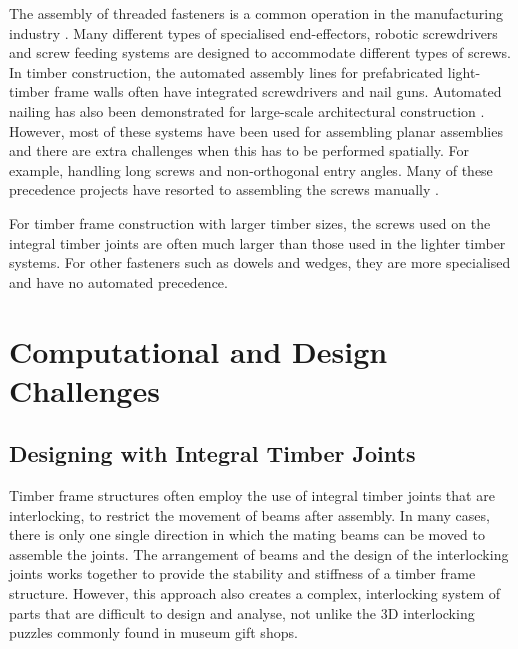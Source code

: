 The assembly of threaded fasteners is a common operation in the manufacturing industry \parencite{jiaSurveyAutomatedThreaded2019}. Many different types of specialised end-effectors, robotic screwdrivers and screw feeding systems are designed to accommodate different types of screws. In timber construction, the automated assembly lines for prefabricated light-timber frame walls often have integrated screwdrivers and nail guns. Automated nailing has also been demonstrated for large-scale architectural construction \parencite{apolinarskaComplexTimberStructures2018, apolinarskaSequentialRoof2016}. However, most of these systems have been used for assembling planar assemblies and there are extra challenges when this has to be performed spatially. For example, handling long screws and non-orthogonal entry angles. Many of these precedence projects have resorted to assembling the screws manually \parencite{apolinarskaRoboticAssemblyTimber2021, thomaRoboticFabricationBespoke2018, willmannNewParadigmsAutomatic2016}. 

For timber frame construction with larger timber sizes, the screws used on the integral timber joints are often much larger than those used in the lighter timber systems. For other fasteners such as dowels and wedges, they are more specialised and have no automated precedence. 

\section{Computational and Design Challenges}
\label{section:challenges_computational_and_design_challenges}

\subsection{Designing with Integral Timber Joints}
\label{subsection:challenges_designing_with_integral_timber_joints}

Timber frame structures often employ the use of integral timber joints that are interlocking, to restrict the movement of beams after assembly. In many cases, there is only one single direction in which the mating beams can be moved to assemble the joints. The arrangement of beams and the design of the interlocking joints works together to provide the stability and stiffness of a timber frame structure. However, this approach also creates a complex, interlocking system of parts that are difficult to design and analyse, not unlike the 3D interlocking puzzles commonly found in museum gift shops.

